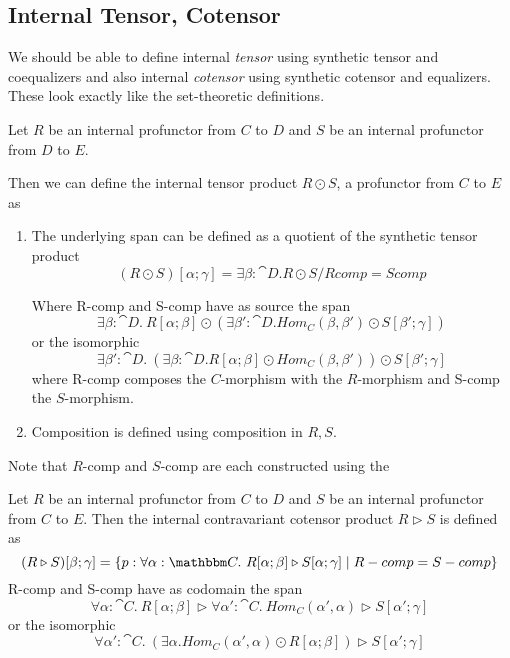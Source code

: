 \documentclass{article}
\begin{document}
\subsection{Internal Tensor, Cotensor}

We should be able to define internal \emph{tensor} using synthetic
tensor and coequalizers and also internal \emph{cotensor} using
synthetic cotensor and equalizers. These look exactly like the
set-theoretic definitions.
\begin{definition}
  Let $R$ be an internal profunctor from $C$ to $D$ and $S$ be an
  internal profunctor from $D$ to $E$.

  Then we can define the internal tensor product $R \odot S$, a
  profunctor from $C$ to $E$ as
  \begin{enumerate}
  \item The underlying span can be defined as a quotient of the synthetic tensor product
    \[ (R \odot S)[\alpha;\gamma] = \exists \beta:\cat D. R \odot S/Rcomp = Scomp \]

    Where R-comp and S-comp have as source the span
    \[ \exists \beta:\cat D.~ R[\alpha;\beta] \odot (\exists \beta':\cat D. Hom_C(\beta,\beta') \odot S[\beta';\gamma]) \]
    or the isomorphic
    \[ \exists \beta':\cat D.~ (\exists \beta:\cat D. R[\alpha;\beta] \odot Hom_C(\beta,\beta')) \odot S[\beta';\gamma] \]
    where R-comp composes the $C$-morphism with the $R$-morphism and
    S-comp the $S$-morphism.
  \item Composition is defined using composition in $R,S$.
  \end{enumerate}
\end{definition}
Note that $R$-comp and $S$-comp are each constructed using the 

\begin{definition}
  Let $R$ be an internal profunctor from $C$ to $D$ and $S$ be an
  internal profunctor from $C$ to $E$. Then the internal contravariant
  cotensor product $R \triangleright S$ is defined as
  \[ (R \triangleright S)[\beta;\gamma] = \{ p : \forall \alpha:\cat C.~ R[\alpha;\beta] \triangleright S[\alpha;\gamma] 
  \pipe R-comp = S-comp \}  \]
  R-comp and S-comp have as codomain the span
  \[ \forall \alpha:\cat C.~ R[\alpha;\beta] \triangleright \forall \alpha':\cat C.~ Hom_C(\alpha',\alpha) \triangleright S[\alpha';\gamma] \]
  or the isomorphic
  \[ \forall \alpha':\cat C.~ (\exists \alpha. Hom_C(\alpha',\alpha) \odot R[\alpha;\beta]) \triangleright S[\alpha';\gamma]
  \]
\end{definition}
\end{document}
